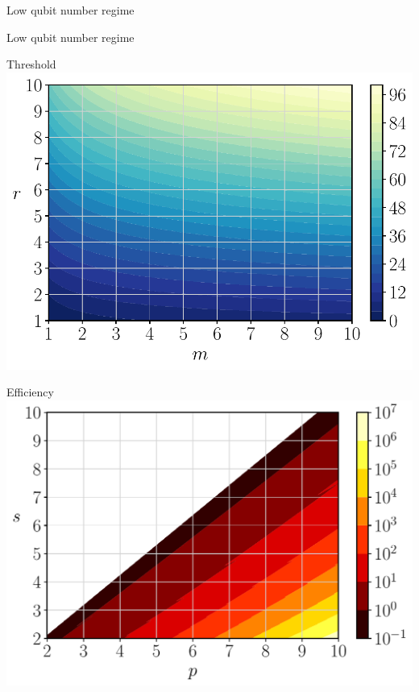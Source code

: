 \documentclass[9pt, handout, aspectratio=169]{beamer}	%
\begin{document}
\begin{frame}{Low qubit number regime}
\begin{multicols}{2}
	\end{multicols}

\end{frame}


\begin{frame}{Low qubit number regime}

	\begin{multicols}{2}

		\begin{center}
			Threshold \\
			\includegraphics[width=.40\paperwidth]{Figures/threshold}
		\end{center}

		\columnbreak

		\begin{center}
			Efficiency \\
			\includegraphics[width=.40\paperwidth]{Figures/efficiency}
		\end{center}


\end{multicols}
\end{frame}
\end{document}
